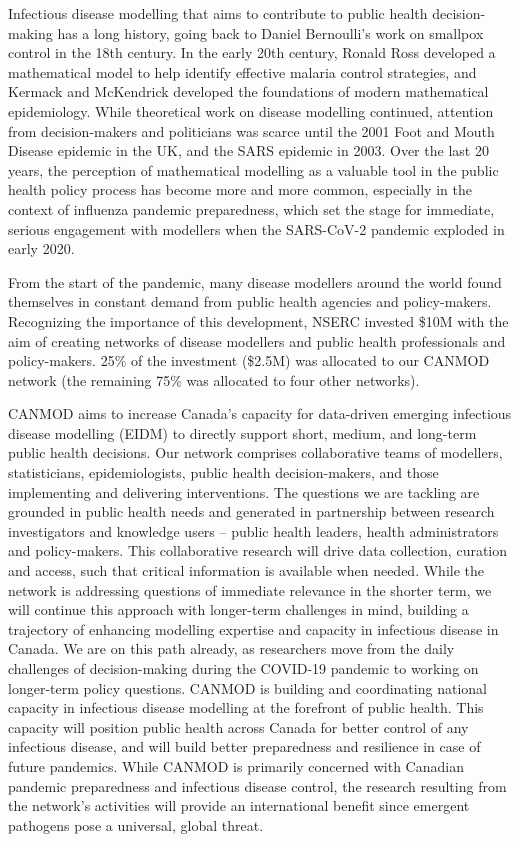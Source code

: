 
Infectious disease modelling that aims to contribute to public health
decision-making has a long history, going back to Daniel Bernoulli’s
work on smallpox control in the 18th century.  In the early 20th
century, Ronald Ross developed a mathematical model to help identify
effective malaria control strategies, and Kermack and McKendrick
developed the foundations of modern mathematical epidemiology.  While
theoretical work on disease modelling continued, attention from
decision-makers and politicians was scarce until the 2001 Foot and
Mouth Disease epidemic in the UK, and the SARS epidemic in 2003.  Over
the last 20 years, the perception of mathematical modelling as a
valuable tool in the public health policy process has become more and
more common, especially in the context of influenza pandemic
preparedness, which set the stage for immediate, serious engagement
with modellers when the SARS-CoV-2 pandemic exploded in early 2020.

From the start of the pandemic, many disease modellers around the
world found themselves in constant demand from public health agencies
and policy-makers.  Recognizing the importance of this development,
NSERC invested \$10M with the aim of creating networks of disease
modellers and public health professionals and policy-makers.  25\% of
the investment (\$2.5M) was allocated to our CANMOD network (the
remaining 75\% was allocated to four other networks).

CANMOD aims to increase Canada’s capacity for data-driven emerging
infectious disease modelling (EIDM) to directly support short, medium,
and long-term public health decisions. Our network comprises
collaborative teams of modellers, statisticians, epidemiologists,
public health decision-makers, and those implementing and delivering
interventions. The questions we are tackling are grounded in public
health needs and generated in partnership between research
investigators and knowledge users -- public health leaders, health
administrators and policy-makers. This collaborative research will
drive data collection, curation and access, such that critical
information is available when needed. While the network is addressing
questions of immediate relevance in the shorter term, we will continue
this approach with longer-term challenges in mind, building a
trajectory of enhancing modelling expertise and capacity in infectious
disease in Canada. We are on this path already, as researchers move
from the daily challenges of decision-making during the COVID-19
pandemic to working on longer-term policy questions. CANMOD is
building and coordinating national capacity in infectious disease
modelling at the forefront of public health. This capacity will
position public health across Canada for better control of any
infectious disease, and will build better preparedness and resilience
in case of future pandemics. While CANMOD is primarily concerned with
Canadian pandemic preparedness and infectious disease control, the
research resulting from the network’s activities will provide an
international benefit since emergent pathogens pose a universal,
global threat.

